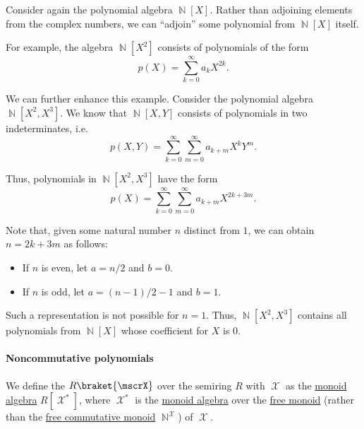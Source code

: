 \begin{example}\label{ex:adjoining_polynomial}
  Consider again the polynomial algebra \( \BbbN[X] \). Rather than adjoining elements from the complex numbers, we can \enquote{adjoin} some polynomial from \( \BbbN[X] \) itself.

  For example, the algebra \( \BbbN[X^2] \) consists of polynomials of the form
  \begin{equation*}
    p(X) = \sum_{k=0}^\infty a_k X^{2k}.
  \end{equation*}

  We can further enhance this example. Consider the polynomial algebra \( \BbbN[X^2, X^3] \). We know that \( \BbbN[X, Y] \) consists of polynomials in two indeterminates, i.e.
  \begin{equation*}
    p(X, Y) = \sum_{k=0}^\infty \sum_{m=0}^\infty a_{k+m} X^k Y^m.
  \end{equation*}

  Thus, polynomials in \( \BbbN[X^2, X^3] \) have the form
  \begin{equation*}
    p(X) = \sum_{k=0}^\infty \sum_{m=0}^\infty a_{k+m} X^{2k + 3m}.
  \end{equation*}

  Note that, given some natural number \( n \) distinct from \( 1 \), we can obtain \( n = 2k + 3m \) as follows:
  \begin{itemize}
    \item If \( n \) is even, let \( a = n / 2 \) and \( b = 0 \).
    \item If \( n \) is odd, let \( a = (n - 1) / 2 - 1 \) and \( b = 1 \).
  \end{itemize}

  Such a representation is not possible for \( n = 1 \). Thus, \( \BbbN[X^2, X^3] \) contains all polynomials from \( \BbbN[X] \) whose coefficient for \( X \) is \( 0 \).
\end{example}

\paragraph{Noncommutative polynomials}

\begin{definition}\label{def:noncommutative_polynomial_algebra}
  We define the  \( R\braket{ \mscrX } \) over the semiring \( R \) with  \( \mscrX \) as the \hyperref[def:semigroup_algebra]{monoid algebra} \( R[\mscrX^*] \), where \( \mscrX^* \) is the
  \hyperref[def:semigroup_algebra]{monoid algebra} over the \hyperref[def:free_monoid]{free monoid} (rather than the \hyperref[def:free_commutative_monoid]{free commutative monoid} \( \BbbN^\mscrX \)) of \( \mscrX \).
\end{definition}

